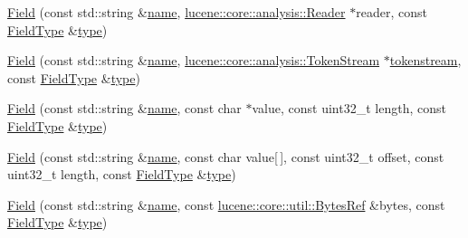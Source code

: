 \begin{DoxyCompactItemize}
\item 
\mbox{\hyperlink{classlucene_1_1core_1_1document_1_1Field_ac67baea5a3a4bc2a20bfbdb92a25a7d3}{Field}} (const std\+::string \&\mbox{\hyperlink{classlucene_1_1core_1_1document_1_1Field_a52f673f3b3abb14b180f5159f4726537}{name}}, \mbox{\hyperlink{classlucene_1_1core_1_1analysis_1_1Reader}{lucene\+::core\+::analysis\+::\+Reader}} $\ast$reader, const \mbox{\hyperlink{classlucene_1_1core_1_1document_1_1FieldType}{Field\+Type}} \&\mbox{\hyperlink{classlucene_1_1core_1_1document_1_1Field_a7d5849d933ebde73422710069643ccff}{type}})
\item 
\mbox{\hyperlink{classlucene_1_1core_1_1document_1_1Field_a10e82fd9310fb348b5f99b80b002aa00}{Field}} (const std\+::string \&\mbox{\hyperlink{classlucene_1_1core_1_1document_1_1Field_a52f673f3b3abb14b180f5159f4726537}{name}}, \mbox{\hyperlink{classlucene_1_1core_1_1analysis_1_1TokenStream}{lucene\+::core\+::analysis\+::\+Token\+Stream}} $\ast$\mbox{\hyperlink{classlucene_1_1core_1_1document_1_1Field_a9ae72843cbdd8524362f65ee9f2c7355}{tokenstream}}, const \mbox{\hyperlink{classlucene_1_1core_1_1document_1_1FieldType}{Field\+Type}} \&\mbox{\hyperlink{classlucene_1_1core_1_1document_1_1Field_a7d5849d933ebde73422710069643ccff}{type}})
\item 
\mbox{\hyperlink{classlucene_1_1core_1_1document_1_1Field_adf0ec8bb3cc3cf458c78ed02f77afd3e}{Field}} (const std\+::string \&\mbox{\hyperlink{classlucene_1_1core_1_1document_1_1Field_a52f673f3b3abb14b180f5159f4726537}{name}}, const char $\ast$value, const uint32\+\_\+t length, const \mbox{\hyperlink{classlucene_1_1core_1_1document_1_1FieldType}{Field\+Type}} \&\mbox{\hyperlink{classlucene_1_1core_1_1document_1_1Field_a7d5849d933ebde73422710069643ccff}{type}})
\item 
\mbox{\hyperlink{classlucene_1_1core_1_1document_1_1Field_a40c949b1b51b439165de2a3476359a99}{Field}} (const std\+::string \&\mbox{\hyperlink{classlucene_1_1core_1_1document_1_1Field_a52f673f3b3abb14b180f5159f4726537}{name}}, const char value\mbox{[}$\,$\mbox{]}, const uint32\+\_\+t offset, const uint32\+\_\+t length, const \mbox{\hyperlink{classlucene_1_1core_1_1document_1_1FieldType}{Field\+Type}} \&\mbox{\hyperlink{classlucene_1_1core_1_1document_1_1Field_a7d5849d933ebde73422710069643ccff}{type}})
\item 
\mbox{\hyperlink{classlucene_1_1core_1_1document_1_1Field_aa5b5549c89b6da80093ffa9ba4f218f8}{Field}} (const std\+::string \&\mbox{\hyperlink{classlucene_1_1core_1_1document_1_1Field_a52f673f3b3abb14b180f5159f4726537}{name}}, const \mbox{\hyperlink{classlucene_1_1core_1_1util_1_1BytesRef}{lucene\+::core\+::util\+::\+Bytes\+Ref}} \&bytes, const \mbox{\hyperlink{classlucene_1_1core_1_1document_1_1FieldType}{Field\+Type}} \&\mbox{\hyperlink{classlucene_1_1core_1_1document_1_1Field_a7d5849d933ebde73422710069643ccff}{type}})

\end{DoxyCompactItemize}

